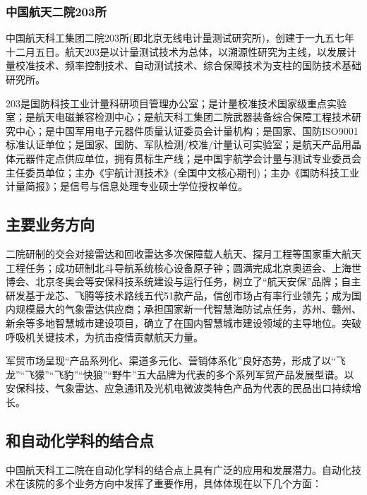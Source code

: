 \documentclass[12pt, a4paper, oneside]{ctexart}
\begin{document}
\subsubsection{中国航天二院203所}
中国航天科工集团二院203所(即北京无线电计量测试研究所)，创建于一九五七年十二月五日。航天203是以计量测试技术为总体，以溯源性研究为主线，以发展计量校准技术、频率控制技术、自动测试技术、综合保障技术为支柱的国防技术基础研究所。

203是国防科技工业计量科研项目管理办公室；是计量校准技术国家级重点实验室；是航天电磁兼容检测中心；是航天科工集团二院武器装备综合保障工程技术研究中心；是中国军用电子元器件质量认证委员会计量机构；是国家、国防ISO9001标准认证单位；是国家、国防、军队检测/校准/计量认可实验室；是航天产品用晶体元器件定点供应单位，拥有贯标生产线；是中国宇航学会计量与测试专业委员会主任委员单位；主办《宇航计测技术》(全国中文核心期刊)；主办《国防科技工业计量简报》；是信号与信息处理专业硕士学位授权单位。
\subsection{主要业务方向}

二院研制的交会对接雷达和回收雷达多次保障载人航天、探月工程等国家重大航天工程任务；成功研制北斗导航系统核心设备原子钟；圆满完成北京奥运会、上海世博会、北京冬奥会等安保科技系统建设与运行任务，树立了“航天安保”品牌；自主研发基于龙芯、飞腾等技术路线五代51款产品，信创市场占有率行业领先；成为国内规模最大的气象雷达供应商；承担国家新一代智慧海防试点任务，苏州、赣州、新余等多地智慧城市建设项目，确立了在国内智慧城市建设领域的主导地位。突破呼吸机关键技术，为抗击疫情贡献航天力量。

军贸市场呈现“产品系列化、渠道多元化、营销体系化”良好态势，形成了以“飞龙”“飞獴”“飞豹”“快狼”“野牛”五大品牌为代表的多个系列军贸产品发展型谱。以安保科技、气象雷达、应急通讯及光机电微波类特色产品为代表的民品出口持续增长。

\subsection{和自动化学科的结合点}

中国航天科工二院在自动化学科的结合点上具有广泛的应用和发展潜力。自动化技术在该院的多个业务方向中发挥了重要作用，具体体现在以下几个方面：
\end{document}
